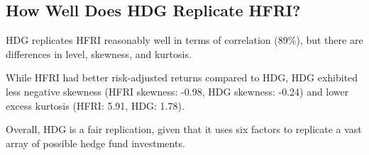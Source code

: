 \documentclass{article}
\begin{document}
\subsection{How Well Does HDG Replicate HFRI?}
HDG replicates HFRI reasonably well in terms of correlation (89\%), but there are differences in level, skewness, and kurtosis.

While HFRI had better risk-adjusted returns compared to HDG, HDG exhibited less negative skewness (HFRI skewness: -0.98, HDG skewness: -0.24) and lower excess kurtosis (HFRI: 5.91, HDG: 1.78).

Overall, HDG is a fair replication, given that it uses six factors to replicate a vast array of possible hedge fund investments.
\end{document}

